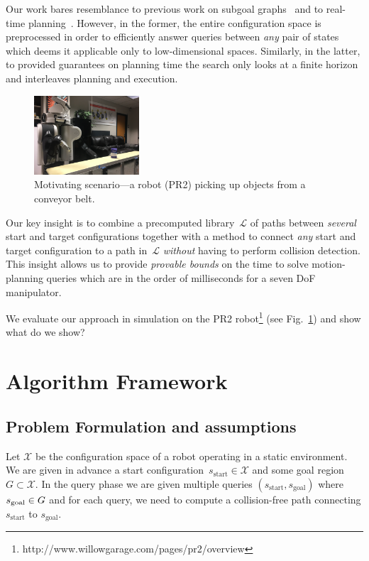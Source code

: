 \documentclass[letterpaper, 10 pt, conference]{ieeeconf}  %
\newcommand{\calX}{\ensuremath{\mathcal{X}}\xspace}
\newcommand{\calL}{\ensuremath{\mathcal{L}}\xspace}
\newcommand{\sStart}{\ensuremath{s_{\text{start}}\xspace}}
\begin{document}
Our work bares resemblance to previous work on 
subgoal graphs~\cite{UK17,UK18} and to real-time planning~\cite{KL06,KS09,K90}.
However, in the former, the entire configuration space is preprocessed in order to efficiently answer queries between \emph{any} pair of states which deems it applicable only to low-dimensional spaces.
Similarly, in the latter, to provided guarantees on planning time the search only looks at a finite horizon and interleaves planning and execution.

\begin{figure}[tb]
  \centering
    \includegraphics[width=0.35\textwidth]{PR2.jpg}
  \caption{
  Motivating scenario---a robot (PR2) picking up objects from a conveyor belt.
}
    \label{fig:PR2}
 \vspace{-3mm}
\end{figure}


Our key insight is to combine a precomputed library~$\calL$ of paths between \emph{several} start and target configurations together with a method to connect \emph{any} start and target configuration to a path in~$\calL$ \emph{without} having to perform collision detection.
This insight allows us to provide \emph{provable bounds} on the time to solve motion-planning queries which are in the order of milliseconds for a seven DoF manipulator.

We evaluate our approach in simulation on the PR2 robot\footnote{http://www.willowgarage.com/pages/pr2/overview} (see Fig.~\ref{fig:PR2})
and show
{\color{blue} what do we show?}

\section{Algorithm Framework}
\subsection{Problem Formulation and assumptions}
Let $\calX$ be the configuration space of a robot operating in a static environment.
We are given in advance a start configuration~$\sStart \in \calX$ and some goal region~$G \subset \calX$.
In the query phase we are given multiple queries $(\sStart, s_{\text{goal}})$ where $s_{\rm goal} \in G$ and for each query, we need to compute a collision-free path connecting $\sStart$ to $s_{\text{goal}}$.
\end{document}
